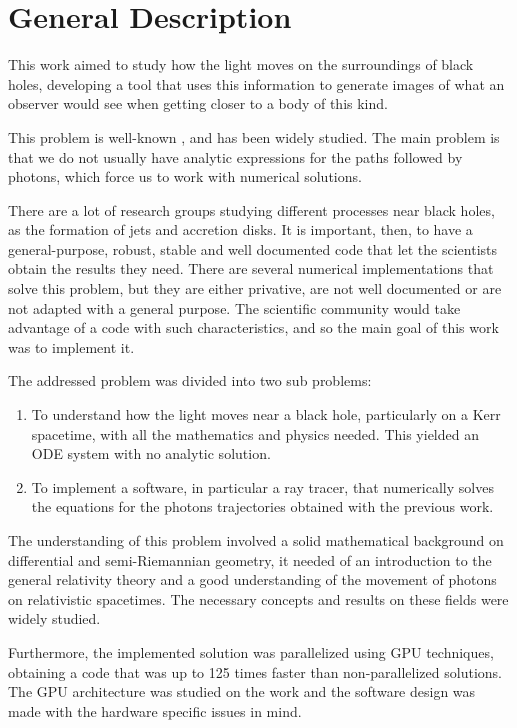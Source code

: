 \chapter{General Description}

This work aimed to study how the light moves on the surroundings of black holes, developing a tool that uses this information to generate images of what an observer would see when getting closer to a body of this kind.

This problem is well-known \cite{oneill83} \cite{oneill95}, and has been widely studied. The main problem is that we do not usually have analytic expressions for the paths followed by photons, which force us to work with numerical solutions.

There are a lot of research groups studying different processes near black holes, as the formation of jets and accretion disks. It is important, then, to have a general-purpose, robust, stable and well documented code that let the scientists obtain the results they need. There are several numerical implementations \cite{thorne15} \cite{chan13} that solve this problem, but they are either privative, are not well documented or are not adapted with a general purpose. The scientific community would take advantage of a code with such characteristics, and so the main goal of this work was to implement it.

The addressed problem was divided into two sub problems:
\begin{enumerate}
	\item To understand how the light moves near a black hole, particularly on a Kerr spacetime, with all the mathematics and physics needed. This yielded an \ac{ODE} system with no analytic solution.
	\item To implement a software, in particular a ray tracer, that numerically solves the equations for the photons trajectories obtained with the previous work.
\end{enumerate}

The understanding of this problem involved a solid mathematical background on differential and semi-Riemannian geometry, it needed of an introduction to the general relativity theory and a good understanding of the movement of photons on relativistic spacetimes. The necessary concepts and results on these fields were widely studied.

Furthermore, the implemented solution was parallelized using \ac{GPU} techniques, obtaining a code that was up to 125 times faster than non-parallelized solutions. The \ac{GPU} architecture was studied on the work and the software design was made with the hardware specific issues in mind.

